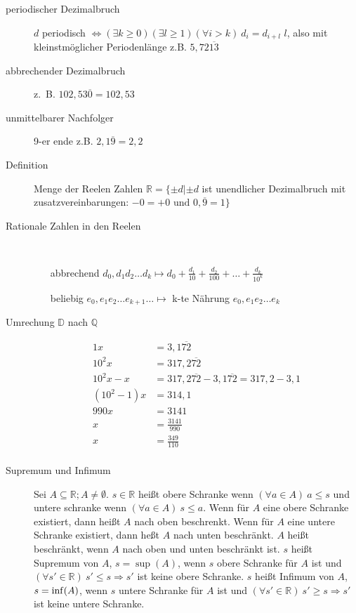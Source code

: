 \begin{description}
    \item[periodischer Dezimalbruch] $d$ periodisch
    $\Leftrightarrow (\exists k \geq 0)(\exists l \geq 1) (\forall i > k)\ d_i= d_{i + l}$ $l$, also mit kleinstmöglicher Periodenlänge z.B. $5{,}72\overline{13}$
    \item[abbrechender Dezimalbruch] z.~B. $102{,}53\overline{0} = 102{,}53$
    \item[unmittelbarer Nachfolger] 9-er ende z.B. $2{,}1\overline{9} = 2{,}2$
    \item[Definition] Menge der Reelen Zahlen $\mathbb{R} = \lbrace \pm d | \pm d $ ist unendlicher Dezimalbruch mit zusatzvereinbarungen: $ -0 = +0 \textrm{ und } 0{,}\overline{9} = 1 \rbrace$
    \item[Rationale Zahlen in den Reelen] \
    \begin{itemize}
        \item[abbrechend] $d_0{,}d_1 d_2 \dots d_k \longmapsto d_0 + \frac{d_1}{10}+\frac{d_2}{100} + \dots + \frac{d_k}{10^k}$
        \item[beliebig] $e_0{,}e_1 e_2 \dots e_{k + 1} \dots \longmapsto$ k-te Nährung $e_0{,}e_1 e_2 \dots e_k$
    \end{itemize}
    \item[Umrechung $\mathbb{D}$ nach $\mathbb{Q}$]
    \begin{alignat*}{1}
        x         & = 3{,}1\overline{72}                                          \\
        10^{2}x     & = 317{,}2\overline{72}                                        \\
        10^{2}x-x   & = 317{,}2\overline{72} - 3{,}1\overline{72} = 317{,}2 - 3{,}1 \\
        (10^2-1)x & = 314{,}1                                                     \\
        990x      & = 3141                                                        \\
        x         & = \frac{3141}{990}                                            \\
        x         & = \frac{349}{110}                                             \\
    \end{alignat*}
    \item[Supremum und Infimum] Sei $A \subseteq \mathbb{R}; A \not = \emptyset$. $s \in \mathbb{R}$ heißt obere Schranke wenn $(\forall a \in A)\ a \leq s$ und untere schranke wenn $(\forall a \in A)\ s \leq a$.
    Wenn für $A$ eine obere Schranke existiert, dann heißt $A$ nach oben beschrenkt.
    Wenn für $A$ eine untere Schranke existiert, dann heßt $A$ nach unten beschränkt. $A$ heißt beschränkt, wenn $A$ nach oben und unten beschränkt ist. $s$ heißt Supremum von $A$, $s = \sup(A)$, wenn $s$ obere Schranke für $A$ ist und $(\forall s' \in \mathbb{R})\ s' \leq s \Rightarrow s'$ ist keine obere Schranke. $s$ heißt Infimum von $A$, $s = \operatorname{inf}(A)$, wenn $s$ untere Schranke für $A$ ist und $(\forall s' \in \mathbb{R})\ s' \geq s \Rightarrow s'$ ist keine untere Schranke.


\end{description}
